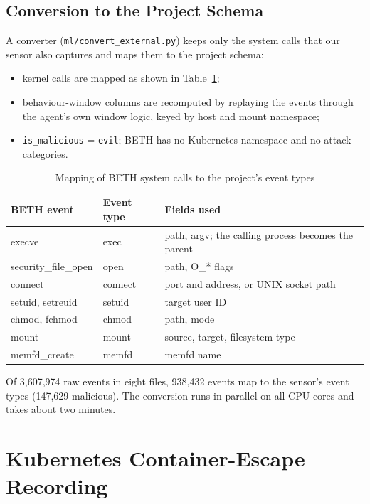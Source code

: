 \subsection{Conversion to the Project Schema}

A converter (\texttt{ml/convert\_external.py}) keeps only the system calls that our
sensor also captures and maps them to the project schema:
\begin{itemize}
    \item kernel calls are mapped as shown in Table~\ref{tab:bethmap};
    \item behaviour-window columns are recomputed by replaying the events through the
          agent's own window logic, keyed by host and mount namespace;
    \item \texttt{is\_malicious} = \texttt{evil}; BETH has no Kubernetes namespace and no
          attack categories.
\end{itemize}
\begin{table}[H]
\centering
\caption{Mapping of BETH system calls to the project's event types}
\label{tab:bethmap}
\small
\begin{tabular}{>{\ttfamily}l l >{\raggedright\arraybackslash}p{6.2cm}}
\toprule
\normalfont\textbf{BETH event} & \textbf{Event type} & \textbf{Fields used} \\
\midrule
execve & exec & path, argv; the calling process becomes the parent \\
security\_file\_open & open & path, O\_* flags \\
connect & connect & port and address, or UNIX socket path \\
setuid, setreuid & setuid & target user ID \\
chmod, fchmod & chmod & path, mode \\
mount & mount & source, target, filesystem type \\
memfd\_create & memfd & memfd name \\
\bottomrule
\end{tabular}
\end{table}

Of 3,607,974 raw events in eight files, 938,432 events map to the sensor's event types
(147,629 malicious). The conversion runs in parallel on all CPU cores and takes about
two minutes.

\section{Kubernetes Container-Escape Recording}

